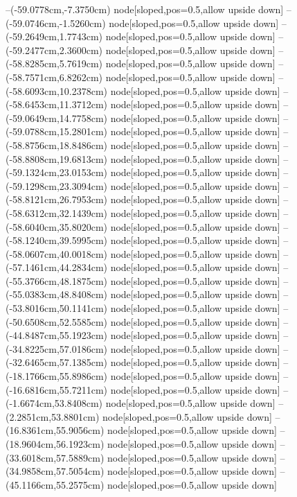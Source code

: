 --(-59.0778cm,-7.3750cm) node[sloped,pos=0.5,allow upside down]{\ArrowIn}
--(-59.0746cm,-1.5260cm) node[sloped,pos=0.5,allow upside down]{\ArrowIn}
--(-59.2649cm,1.7743cm) node[sloped,pos=0.5,allow upside down]{\ArrowIn}
--(-59.2477cm,2.3600cm) node[sloped,pos=0.5,allow upside down]{\arrowIn}
--(-58.8285cm,5.7619cm) node[sloped,pos=0.5,allow upside down]{\ArrowIn}
--(-58.7571cm,6.8262cm) node[sloped,pos=0.5,allow upside down]{\ArrowIn}
--(-58.6093cm,10.2378cm) node[sloped,pos=0.5,allow upside down]{\ArrowIn}
--(-58.6453cm,11.3712cm) node[sloped,pos=0.5,allow upside down]{\ArrowIn}
--(-59.0649cm,14.7758cm) node[sloped,pos=0.5,allow upside down]{\ArrowIn}
--(-59.0788cm,15.2801cm) node[sloped,pos=0.5,allow upside down]{\arrowIn}
--(-58.8756cm,18.8486cm) node[sloped,pos=0.5,allow upside down]{\ArrowIn}
--(-58.8808cm,19.6813cm) node[sloped,pos=0.5,allow upside down]{\arrowIn}
--(-59.1324cm,23.0153cm) node[sloped,pos=0.5,allow upside down]{\ArrowIn}
--(-59.1298cm,23.3094cm) node[sloped,pos=0.5,allow upside down]{\arrowIn}
--(-58.8121cm,26.7953cm) node[sloped,pos=0.5,allow upside down]{\ArrowIn}
--(-58.6312cm,32.1439cm) node[sloped,pos=0.5,allow upside down]{\ArrowIn}
--(-58.6040cm,35.8020cm) node[sloped,pos=0.5,allow upside down]{\ArrowIn}
--(-58.1240cm,39.5995cm) node[sloped,pos=0.5,allow upside down]{\ArrowIn}
--(-58.0607cm,40.0018cm) node[sloped,pos=0.5,allow upside down]{\arrowIn}
--(-57.1461cm,44.2834cm) node[sloped,pos=0.5,allow upside down]{\ArrowIn}
--(-55.3766cm,48.1875cm) node[sloped,pos=0.5,allow upside down]{\ArrowIn}
--(-55.0383cm,48.8408cm) node[sloped,pos=0.5,allow upside down]{\arrowIn}
--(-53.8016cm,50.1141cm) node[sloped,pos=0.5,allow upside down]{\ArrowIn}
--(-50.6508cm,52.5585cm) node[sloped,pos=0.5,allow upside down]{\ArrowIn}
--(-44.8487cm,55.1923cm) node[sloped,pos=0.5,allow upside down]{\ArrowIn}
--(-34.8225cm,57.0186cm) node[sloped,pos=0.5,allow upside down]{\ArrowIn}
--(-32.6465cm,57.1385cm) node[sloped,pos=0.5,allow upside down]{\ArrowIn}
--(-18.1766cm,55.8986cm) node[sloped,pos=0.5,allow upside down]{\ArrowIn}
--(-16.6816cm,55.7211cm) node[sloped,pos=0.5,allow upside down]{\ArrowIn}
--(-1.6674cm,53.8408cm) node[sloped,pos=0.5,allow upside down]{\ArrowIn}
--(2.2851cm,53.8801cm) node[sloped,pos=0.5,allow upside down]{\ArrowIn}
--(16.8361cm,55.9056cm) node[sloped,pos=0.5,allow upside down]{\ArrowIn}
--(18.9604cm,56.1923cm) node[sloped,pos=0.5,allow upside down]{\ArrowIn}
--(33.6018cm,57.5889cm) node[sloped,pos=0.5,allow upside down]{\ArrowIn}
--(34.9858cm,57.5054cm) node[sloped,pos=0.5,allow upside down]{\ArrowIn}
--(45.1166cm,55.2575cm) node[sloped,pos=0.5,allow upside down]{\ArrowIn}
